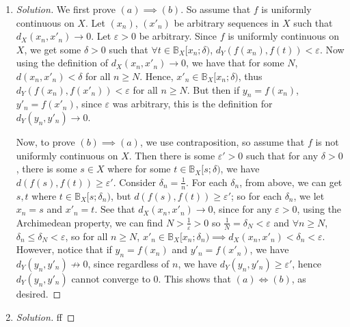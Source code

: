 \documentclass{article}
\newcommand{\ep}{{\varepsilon}}
\begin{document}
\begin{enumerate}
	\item \begin{proof}[Solution]\let\qed\relax
		We first prove $(a) \implies (b)$.
		So assume that $f$ is uniformly continuous on $X$.
		Let $(x_n)$, $(x'_n)$ be arbitrary sequences in $X$
		such that $d_X(x_n,x'_n) \to 0$.
		Let $\ep > 0$ be arbitrary.
		Since $f$ is uniformly continuous on $X$,
		we get some $\delta > 0$ such that
		$\forall t \in \mathbb{B}_X[x_n;\delta)$,
		$d_Y(f(x_n),f(t)) < \ep$.
		Now using the definition of $d_X(x_n,x'_n) \to 0$,
		we have that for some $N$, $d(x_n,x'_n) < \delta$
		for all $n \geq N$.
		Hence, $x'_n \in \mathbb{B}_X[x_n;\delta)$,
		thus $d_Y(f(x_n),f(x'_n)) < \ep$ for all $n \geq N$.
		But then if $y_n = f(x_n)$, $y'_n = f(x'_n)$,
		since $\ep$ was arbitrary,
		this is the definition for $d_Y(y_n,y'_n) \to 0$.

		Now, to prove $(b) \implies (a)$,
		we use contraposition,
		so assume that $f$ is not uniformly continuous on $X$.
		Then there is some $\ep' > 0$ such that for any $\delta > 0$,
		there is some $s \in X$ where for some $t \in \mathbb{B}_X[s;\delta)$,
		we have $d(f(s),f(t)) \geq \ep'$.
		Consider $\delta_n = \frac{1}{n}$.
		For each $\delta_n$, from above, we can get $s,t$ where
		$t \in \mathbb{B}_X[s;\delta_n)$, but $d(f(s),f(t))\geq \ep'$;
		so for each $\delta_n$, we let $x_n = s$ and $x'_n = t$.
		See that $d_X(x_n,x'_n) \to 0$,
		since for any $\ep > 0$, using the Archimedean property,
		we can find $N > \frac{1}{\ep} > 0$ so $\frac{1}{N} = \delta_N < \ep$
		and $\forall n \geq N$, $\delta_n \leq \delta_N < \ep$,
		so for all $n \geq N$, $x'_n \in \mathbb{B}_X[x_n;\delta_n)
		\implies d_X(x_n,x'_n) < \delta_n < \ep$.
		However, notice that if $y_n = f(x_n)$ and $y'_n = f(x'_n)$,
		we have $d_Y(y_n,y'_n) \not\to 0$,
		since regardless of $n$, we have $d_Y(y_n,y'_n) \geq \ep'$,
		hence $d_Y(y_n,y'_n)$ cannot converge to $0$.
		This shows that $(a) \iff (b)$, as desired.
	\end{proof}
	\item \begin{proof}[Solution]\let\qed\relax
		ff
	\end{proof}
\end{enumerate}
\clearpage
~\clearpage
\end{document}
